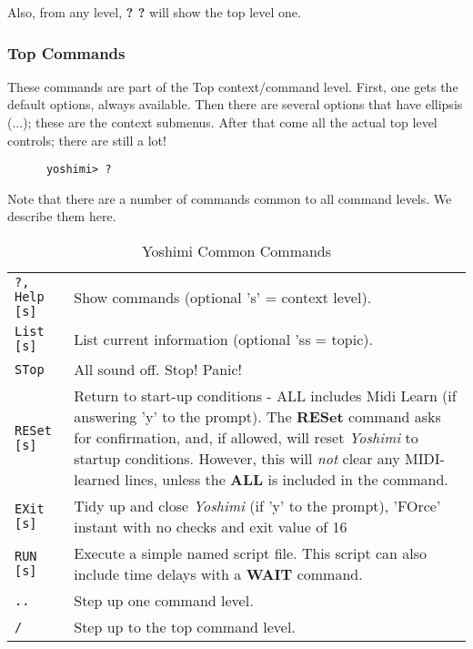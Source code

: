    Also, from any level, \textbf{? ?} will show the top level one.

\subsubsection{Top Commands}
\label{subsec:command_line_top_command_list}

   These commands are part of the Top context/command level.
   First, one gets the default options, always available.
   Then there are several options that have ellipsis (...);
   these are the context submenus.
   After that come all the actual top level controls; there are still a lot!

   \begin{verbatim}
      yoshimi> ?
   \end{verbatim}

   Note that there are a number of commands common to all command levels.
   We describe them here.

\begin{center}
\begin{longtable}{p{2cm} p{10cm}}
\caption[Yoshimi Common Commands]{Yoshimi Common Commands} \\

\texttt{?,  Help [s]} &
   Show commands (optional 's' = context level). \\
\texttt{List [s]} &
   List current information (optional 'ss = topic). \\
\texttt{STop} &
   All sound off.  Stop!  Panic! \\
\texttt{RESet [s]} &
   Return to start-up conditions - ALL includes Midi Learn (if answering
   'y' to the prompt).
   The \textbf{RESet} command asks for confirmation, and, if allowed, will
   reset \textsl{Yoshimi} to startup conditions.
   However, this will \textsl{not} clear any MIDI-learned lines, unless
   the \textbf{ALL} is included in the command.\\
\texttt{EXit [s]} &
   Tidy up and close \textsl{Yoshimi} (if 'y' to the prompt), 'FOrce' instant with no checks and exit value of 16 \\
\texttt{RUN [s]} &
   Execute a simple named script file.
   This script can also include time delays with a \textbf{WAIT} command.\\
\texttt{..} &
   Step up one command level. \\
\texttt{/} &
   Step up to the top command level. \\

\end{longtable}
\end{center}

